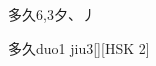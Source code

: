 \begin{entry}{多久}{6,3}{⼣、⼃}
  \begin{phonetics}{多久}{duo1 jiu3}[][HSK 2]
  \end{phonetics}
\end{entry}

